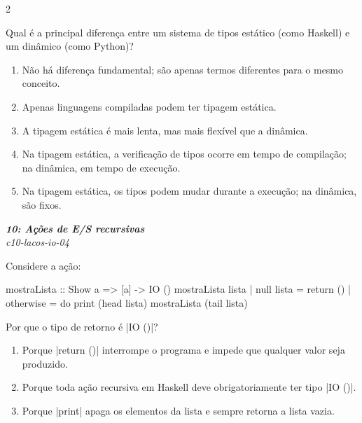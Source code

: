 \documentclass[a4paper,10pt,brazil]{article}
\begin{document}
\begin{multicols}{2}
\begin{flushright}
\end{flushright}
Qual é a principal diferença entre um sistema de tipos estático (como Haskell) e um dinâmico (como Python)?

\begin{enumerate}
  \item Não há diferença fundamental; são apenas termos diferentes para o mesmo conceito.

  \item Apenas linguagens compiladas podem ter tipagem estática.

  \item A tipagem estática é mais lenta, mas mais flexível que a dinâmica.

  \item Na tipagem estática, a verificação de tipos ocorre em tempo de compilação; na dinâmica, em tempo de execução.

  \item Na tipagem estática, os tipos podem mudar durante a execução; na dinâmica, são fixos.


\end{enumerate}

\begin{flushright}
  \footnotesize
  \textit{\textbf{10: Ações de E/S recursivas}}\\
  \textit{c10-lacos-io-04}\\

\end{flushright}
Considere a ação:

\begin{haskellcode}
mostraLista :: Show a => [a] -> IO ()
mostraLista lista
  | null lista = return ()
  | otherwise = do
      print (head lista)
      mostraLista (tail lista)
\end{haskellcode}

Por que o tipo de retorno é \haskellinline|IO ()|?

\begin{enumerate}
  \item Porque \haskellinline|return ()| interrompe o programa e impede que qualquer valor seja produzido.

  \item Porque toda ação recursiva em Haskell deve obrigatoriamente ter tipo \haskellinline|IO ()|.

  \item Porque \haskellinline|print| apaga os elementos da lista e sempre retorna a lista vazia.


\end{enumerate}
\end{multicols}
\end{document}
